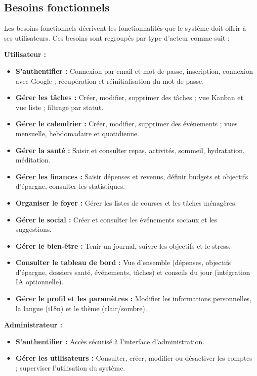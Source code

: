 \subsection{Besoins fonctionnels}
Les besoins fonctionnels décrivent les fonctionnalités que le système doit offrir à ses utilisateurs. Ces besoins sont regroupés par type d'acteur comme suit :

\textbf{Utilisateur :}
\begin{itemize}
  \item \textbf{S'authentifier :} Connexion par email et mot de passe, inscription, connexion avec Google ; récupération et réinitialisation du mot de passe.
  \item \textbf{Gérer les tâches :} Créer, modifier, supprimer des tâches ; vue Kanban et vue liste ; filtrage par statut.
  \item \textbf{Gérer le calendrier :} Créer, modifier, supprimer des événements ; vues mensuelle, hebdomadaire et quotidienne.
  \item \textbf{Gérer la santé :} Saisir et consulter repas, activités, sommeil, hydratation, méditation.
  \item \textbf{Gérer les finances :} Saisir dépenses et revenus, définir budgets et objectifs d'épargne, consulter les statistiques.
  \item \textbf{Organiser le foyer :} Gérer les listes de courses et les tâches ménagères.
  \item \textbf{Gérer le social :} Créer et consulter les événements sociaux et les suggestions.
  \item \textbf{Gérer le bien-être :} Tenir un journal, suivre les objectifs et le stress.
  \item \textbf{Consulter le tableau de bord :} Vue d'ensemble (dépenses, objectifs d'épargne, dossiers santé, événements, tâches) et conseils du jour (intégration IA optionnelle).
  \item \textbf{Gérer le profil et les paramètres :} Modifier les informations personnelles, la langue (i18n) et le thème (clair/sombre).
\end{itemize}

\textbf{Administrateur :}
\begin{itemize}
  \item \textbf{S'authentifier :} Accès sécurisé à l'interface d'administration.
  \item \textbf{Gérer les utilisateurs :} Consulter, créer, modifier ou désactiver les comptes ; superviser l'utilisation du système.
\end{itemize}

